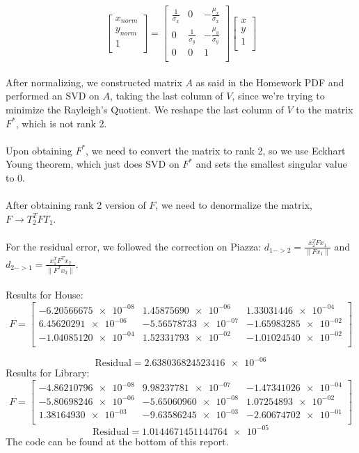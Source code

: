 \documentclass{article}\usepackage{amsmath,amssymb,amsthm,tikz,tkz-graph,color,chngpage,soul,hyperref,csquotes,graphicx,floatrow}\newcommand*{\QEDB}{\hfill\ensuremath{\square}}\newtheorem*{prop}{Proposition}\renewcommand{\theenumi}{\alph{enumi}}\usepackage[shortlabels]{enumitem}\usepackage[nobreak=true]{mdframed}\usetikzlibrary{matrix,calc}\MakeOuterQuote{"}\usepackage[margin=0.95in]{geometry} \newtheorem{theorem}{Theorem}
\begin{document}
\begin{mdframed}
\[ 
\begin{bmatrix}
    x_{norm} \\
    y_{norm} \\
    1 \\
  \end{bmatrix}
  =
\begin{bmatrix}
    \frac{1}{\sigma_{x}} & 0 & -\frac{\mu_{x}}{\sigma_{x}} \\
    0 & \frac{1}{\sigma_{y}} & -\frac{\mu_{y}}{\sigma_{y}} \\
    0 & 0 & 1 \\
\end{bmatrix}
\begin{bmatrix}
    x \\
    y \\
    1 \\
\end{bmatrix}
\]
\\After normalizing, we constructed matrix $ A $ as said in the Homework PDF and performed an SVD on $ A $, taking the last column of $ V $, since we're trying to minimize the Rayleigh's Quotient. We reshape the last column of $ V $ to the matrix $ F^* $, which is not rank 2.\\\\ Upon obtaining $ F^* $, we need to convert the matrix to rank 2, so we use Eckhart Young theorem, which just does SVD on $ F^* $ and sets the smallest singular value to 0. \\\\  After obtaining rank 2 version of $ F $, we need to denormalize the matrix, $ F \rightarrow T^{T}_{2}FT_{1} $. \\\\ For the residual error, we followed the correction on Piazza: $ d_{1->2} = \frac{x_2^TFx_1}{\|Fx_1\|} $ and $d_{2->1} = \frac{x_1^TF^Tx_2}{\|F^Tx_2\|}$. \\\\ Results for House:
\[ F = 
\begin{bmatrix}
 \num{-6.20566675e-08} & \num{1.45875690e-06} & \num{1.33031446e-04} \\
 \num{6.45620291e-06} & \num{-5.56578733e-07} & \num{-1.65983285e-02} \\
 \num{-1.04085120e-04} & \num{1.52331793e-02} & \num{-1.01024540e-02} \\
\end{bmatrix}
\]

\[ \text{Residual}= \num{2.638036824523416e-06} \]
Results for Library:
\[ F = 
\begin{bmatrix}
 \num{-4.86210796e-08} & \num{9.98237781e-07} & \num{-1.47341026e-04} \\
 \num{-5.80698246e-06} & \num{-5.65060960e-08} & \num{1.07254893e-02} \\
 \num{1.38164930e-03} & \num{-9.63586245e-03} & \num{-2.60674702e-01} \\
\end{bmatrix}
\]
\[ \text{Residual}= \num{1.0144671451144764e-05} \] The code can be found at the bottom of this report. 

\end{mdframed}
\end{document}
